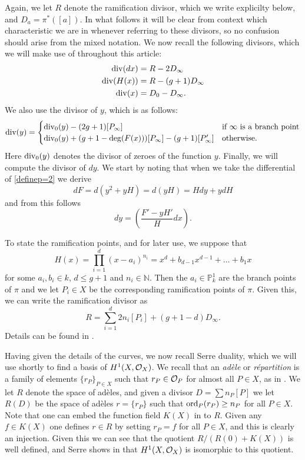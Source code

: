 Again, we let $R$ denote the ramification divisor, which we write explicilty below, and $D_a = \pi^*([a])$.
In what follows it will be clear from context which characteristic we are in whenever referring to these divisors, so no confusion should arise from the mixed notation.
We now recall the following divisors, which we will make use of throughout this article:
\begin{align}
\operatorname{div} (dx) & = R - 2D_\infty \label{divdxp=2}\\
\operatorname{div} (H(x)) & = R - (g+1)D_\infty \label{divhp=2}\\
\operatorname{div} (x) & = D_0 - D_\infty \label{divxp=2}.
\end{align}
We also use the divisor of $y$, which is as follows:
\begin{equation}\label{divyp=2}
\operatorname{div}(y) = \begin{cases}
 \operatorname{div}_0(y) -(2g+1)[P_\infty] & \text{if $\infty$ is a branch point} \\
 \operatorname{div}_0(y) +(g+1-\deg(F(x)))[P_\infty] - (g+1)[P_\infty'] & \text{otherwise.}
\end{cases}
\end{equation}
Here $\operatorname{div}_0(y)$ denotes the divisor of zeroes of the function $y$.
Finally, we will compute the divisor of $dy$.
We start by noting that when we take the differential of \eqref{definep=2} we derive
\[
dF = d\left(y^2 + yH \right) = d(yH) = Hdy + ydH
\]
and from this follows 
\begin{equation}\label{divdyp=2}
dy = \left(\frac{F'-yH'}{H}dx\right).
\end{equation}


To state the ramification points, and for later use, we suppose that 
\begin{equation}\label{hcoefficients}
H(x) = \prod_{i=1}^d (x-a_i)^{n_i} = x^d + b_{d-1}x^{d-1} + \ldots + b_1x
\end{equation}
for some $a_i, b_i \in  k$, $d \leq g+1$ and $n_i \in \mathbb N$.
Then the $a_i \in \mathbb P_k^1$ are the branch points of $\pi$ and we let $P_i \in X$ be the corresponding ramification points of $\pi$.
Given this, we can write the ramification divisor as
\[
R = \sum_{i=1}^d 2n_i[P_i] + (g+1-d)D_\infty.
\]
Details can be found in \cite[\S 6]{faithfulaction}.

Having given the details of the curves, we now recall Serre duality, which we will use shortly to find a basis of $H^1(X,\mathcal{O}_X)$.
We recall that an {\sl ad\`ele} or {\sl r\'epartition} is a family of elements $\{r_P\}_{P\in X}$ such that $r_P \in {\cal O}_P$ for almost all $P\in X$, as in \cite[Chap. II, \S 5]{algebraicgroupsandclassfields}.
We let $R$ denote the space of ad\`eles, and given a divisor $D = \sum n_P[P]$ we let $R(D)$ be the space of ad\`eles $r = \{r_P\}$ such that $\operatorname{ord}_P(r_P) \geq n_P$ for all $P \in X$.
Note that one can embed the function field $K(X)$ in to $R$.
Given any $f \in K(X)$ one defines $r \in R$ by setting $r_P = f$ for all $P \in X$, and this is clearly an injection.
Given this we can see that the quotient $R/(R(0) + K(X))$ is well defined, and Serre shows in \cite[Prop. 3, Chap II]{algebraicgroupsandclassfields} that $H^1(X,\mathcal{O}_X)$ is isomorphic to this quotient.

